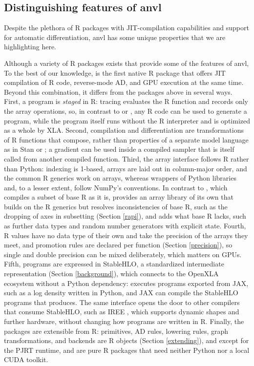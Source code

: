 \subsection{Distinguishing features of anvl}\label{distinguishing}

Despite the plethora of R packages with JIT-compilation capabilities and support for automatic differentiation, {anvl} has some unique properties that we are highlighting here.

Although a variety of R packages exists that provide some of the features of {anvl},
To the best of our knowledge,  is the first native R package that offers JIT compilation of R code, reverse-mode AD, and GPU execution at the same time.
Beyond this combination, it differs from the packages above in several ways.
First, a program is \emph{staged} in R: tracing evaluates the R function and records only the array operations, so, in contrast to  or , any R code can be used to generate a program, while the program itself runs without the R interpreter and is optimized as a whole by XLA.
Second, compilation and differentiation are transformations of R functions that compose, rather than properties of a separate model language as in Stan or ; a gradient can be used inside a compiled sampler that is itself called from another compiled function.
Third, the array interface follows R rather than Python: indexing is 1-based, arrays are laid out in column-major order, and the common R generics work on arrays, whereas wrappers of Python libraries and, to a lesser extent,  follow NumPy's conventions.
In contrast to , which compiles a subset of base R as it is,  provides an array library of its own that builds on the R generics but resolves inconsistencies of base R, such as the dropping of axes in subsetting (Section \ref{rapi}), and adds what base R lacks, such as further data types and random number generators with explicit state.
Fourth, R values have no data type of their own and take the precision of the arrays they meet, and promotion rules are declared per function (Section \ref{precision}), so single and double precision can be mixed deliberately, which matters on GPUs.
Fifth, programs are expressed in StableHLO, a standardized intermediate representation (Section \ref{background}), which connects  to the OpenXLA ecosystem without a Python dependency:  executes programs exported from JAX, such as a log density written in Python, and JAX can compile the StableHLO programs that  produces.
The same interface opens the door to other compilers that consume StableHLO, such as IREE \citep{ref-iree}, which supports dynamic shapes and further hardware, without changing how programs are written in R.
Finally, the packages are extensible from R: primitives, AD rules, lowering rules, graph transformations, and backends are R objects (Section \ref{extending}), and except for the PJRT runtime,  and  are pure R packages that need neither Python nor a local CUDA toolkit.


